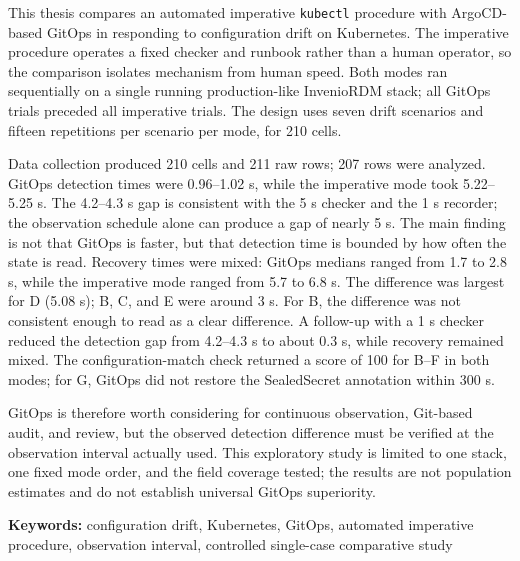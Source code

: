\documentclass[skripsi,indonesia]{ugmskripsi}
\begin{document}
\abstracteng
This thesis compares an automated imperative \texttt{kubectl} procedure with ArgoCD-based GitOps in responding to configuration drift on Kubernetes. The imperative procedure operates a fixed checker and runbook rather than a human operator, so the comparison isolates mechanism from human speed. Both modes ran sequentially on a single running production-like InvenioRDM stack; all GitOps trials preceded all imperative trials. The design uses seven drift scenarios and fifteen repetitions per scenario per mode, for 210 cells.

Data collection produced 210 cells and 211 raw rows; 207 rows were analyzed. GitOps detection times were 0.96--1.02 s, while the imperative mode took 5.22--5.25 s. The 4.2--4.3 s gap is consistent with the 5 s checker and the 1 s recorder; the observation schedule alone can produce a gap of nearly 5 s. The main finding is not that GitOps is faster, but that detection time is bounded by how often the state is read. Recovery times were mixed: GitOps medians ranged from 1.7 to 2.8 s, while the imperative mode ranged from 5.7 to 6.8 s. The difference was largest for D (5.08 s); B, C, and E were around 3 s. For B, the difference was not consistent enough to read as a clear difference. A follow-up with a 1 s checker reduced the detection gap from 4.2--4.3 s to about 0.3 s, while recovery remained mixed. The configuration-match check returned a score of 100 for B--F in both modes; for G, GitOps did not restore the SealedSecret annotation within 300 s.

GitOps is therefore worth considering for continuous observation, Git-based audit, and review, but the observed detection difference must be verified at the observation interval actually used. This exploratory study is limited to one stack, one fixed mode order, and the field coverage tested; the results are not population estimates and do not establish universal GitOps superiority.
\par\vspace{0.1cm}
\noindent\textbf{Keywords:} configuration drift, Kubernetes, GitOps, automated imperative procedure, observation interval, controlled single-case comparative study
\endabstracteng







\clearpage
{}
{}


\appendix
\renewcommand{\thesection}{\thechapter.\arabic{section}}
\renewcommand{\thesubsection}{\thesection.\arabic{subsection}}
\renewcommand{\thetable}{\thechapter.\arabic{table}}
\renewcommand{\thefigure}{\thechapter.\arabic{figure}}


\end{document}
